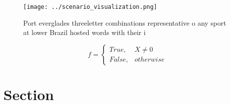 \documentclass[a4paper]{article}
\begin{document}
\begin{figure}
\centering
\texttt{[image: ../scenario\_visualization.png]}
\caption{Port everglades threeletter combinations representative o any sport at lower Brazil hosted words with their i
}
\end{figure}
 
\begin{equation}   f =
\begin{cases} True, & X \neq 0\\
False, & otherwise
\end{cases}
\end{equation}

\section{Section}
\end{document}
